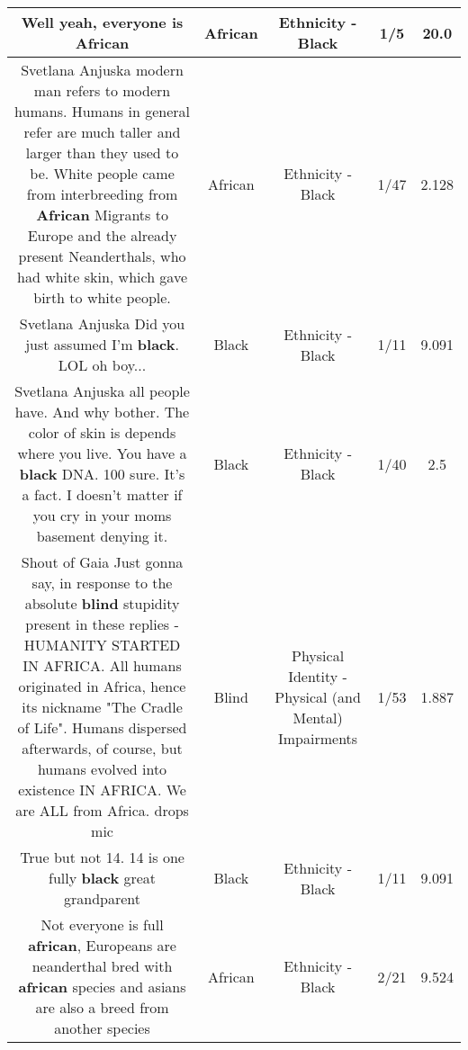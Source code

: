 \documentclass[11pt]{article}
\newlength\mylength
\begin{document}
\begin{center}
\begin{longtable}{|C{.65\mylength}|C{.30\mylength}|C{.12\mylength}|C{.12\mylength}|C{.12\mylength}|}
  \small Well yeah, everyone is African\normalsize   & African & Ethnicity - Black & 1/5 & 20.0 \\  \hline
  \small Svetlana Anjuska modern man refers to  modern humans. Humans in general refer are much taller and larger than they used to be. White people came from interbreeding from \textbf{African} Migrants to Europe and the already present Neanderthals, who had white skin, which gave birth to white people.\normalsize   & African & Ethnicity - Black & 1/47 & 2.128 \\  \hline
  \small Svetlana Anjuska Did you just assumed I'm \textbf{black}. LOL oh boy...\normalsize   & Black & Ethnicity - Black & 1/11 & 9.091 \\  \hline
  \small Svetlana Anjuska all people have. And why bother. The color of skin is depends where you live. You have a \textbf{black} DNA. 100  sure. It's a fact. I doesn't matter if you cry in your moms basement denying it.\normalsize   & Black & Ethnicity - Black & 1/40 & 2.5 \\  \hline
  \small Shout of Gaia Just gonna say, in response to the absolute \textbf{blind} stupidity present in these replies - HUMANITY STARTED IN AFRICA. All humans originated in Africa, hence its nickname "The Cradle of Life". Humans dispersed afterwards, of course, but humans evolved into existence IN AFRICA. We are ALL from Africa. drops mic\normalsize   & Blind & Physical Identity - Physical (and Mental) Impairments & 1/53 & 1.887 \\  \hline
  \small True but not 14. 14 is one fully \textbf{black} great grandparent\normalsize   & Black & Ethnicity - Black & 1/11 & 9.091 \\  \hline
  \small Not everyone is full \textbf{african}, Europeans are neanderthal bred with \textbf{african} species and asians are also a breed from another species\normalsize   & African & Ethnicity - Black & 2/21 & 9.524 \\  \hline

\end{longtable}
\end{center}
\end{document}
